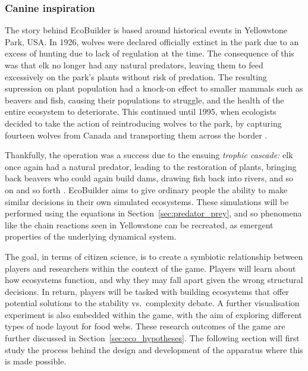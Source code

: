 \subsubsection{Canine inspiration}
\label{sec:yellowstone}
The story behind EcoBuilder is based around historical events in Yellowstone Park, USA. In 1926, wolves were declared officially extinct in the park due to an excess of hunting due to lack of regulation at the time. 
The consequence of this was that elk no longer had any natural predators, leaving them to feed excessively on the park's plants without risk of predation. The resulting supression on plant population had a knock-on effect to smaller mammals such as beavers and fish, causing their populations to struggle, and the health of the entire ecosystem to deteriorate.
This continued until 1995, when ecologists decided to take the action of reintroducing wolves to the park, by capturing fourteen wolves from Canada and transporting them across the border \cite{Smith2003}.

Thankfully, the operation was a success due to the ensuing \emph{trophic cascade:} elk once again had a natural predator, leading to the restoration of plants, bringing back beavers who could again build dams, drawing fish back into rivers, and so on and so forth \cite{Dobson2014}.
EcoBuilder aims to give ordinary people the ability to make similar decisions in their own simulated ecosystems. These simulations will be performed using the equations in Section~\ref{sec:predator_prey}, and so phenomena like the chain reactions seen in Yellowstone can be recreated, as emergent properties of the underlying dynamical system.

The goal, in terms of citizen science, is to create a symbiotic relationship between players and researchers within the context of the game.
Players will learn about how ecosystems function, and why they may fall apart given the wrong structural decisions. In return, players will be tasked with building ecosystems that offer potential solutions to the stability vs.\ complexity debate. A further visualisation experiment is also embedded within the game, with the aim of exploring different types of node layout for food webs. These research outcomes of the game are further discussed in Section~\ref{sec:eco_hypotheses}.
The following section will first study the process behind the design and development of the apparatus where this is made possible.

